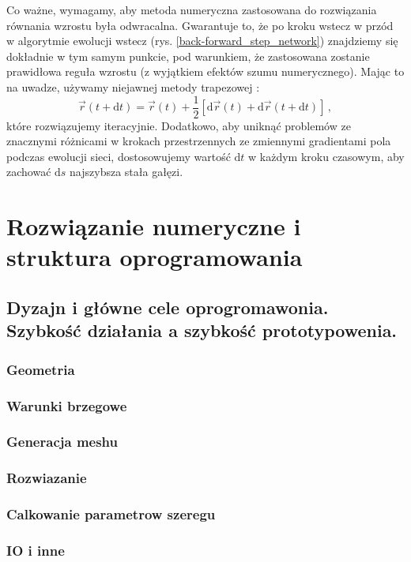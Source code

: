 \documentclass[]{pracamgr}
\begin{document}
    Co ważne, wymagamy, aby metoda numeryczna zastosowana do rozwiązania równania wzrostu była odwracalna. Gwarantuje to, że po kroku wstecz w przód w algorytmie ewolucji wstecz (rys. \ref{back-forward_step_network}) znajdziemy się dokładnie w tym samym punkcie, pod warunkiem, że zastosowana zostanie prawidłowa reguła wzrostu (z wyjątkiem efektów szumu numerycznego). Mając to na uwadze, używamy niejawnej metody trapezowej \cite{iserles2009first}:
    \begin{equation}\label{trapezoidal}
      \vec{r}(t+\textrm{d}t) = \vec{r}(t) + \frac{1}{2}[\textrm{d}\vec{r}(t) + \textrm{d}\vec{r}(t+\textrm{d}t)] \,,
    \end{equation}
    które rozwiązujemy iteracyjnie. Dodatkowo, aby uniknąć problemów ze znacznymi różnicami w krokach przestrzennych ze zmiennymi gradientami pola podczas ewolucji sieci, dostosowujemy wartość $\textrm{d}t$ w każdym kroku czasowym, aby zachować $\textrm{d}s$ najszybsza stała gałęzi.



  \chapter{Rozwiązanie numeryczne i struktura oprogramowania}
    \section{Dyzajn i główne cele oprogromawonia. Szybkość działania a szybkość prototypowenia.}
      \subsection{Geometria}
      \subsection{Warunki brzegowe}
      \subsection{Generacja meshu}
      \subsection{Rozwiazanie}
      \subsection{Calkowanie parametrow szeregu}
      \subsection{IO i inne}
\end{document}
